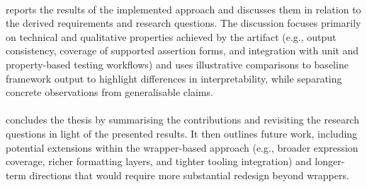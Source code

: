 \paragraph{}
    \label{Thesis Structure: Results and Discussion}
reports the results of the implemented approach and discusses them in relation to the derived
requirements and research questions. The discussion focuses primarily on technical and qualitative
properties achieved by the artifact (e.g., output consistency, coverage of supported assertion
forms, and integration with unit and property-based testing workflows) and uses illustrative
comparisons to baseline framework output to highlight differences in interpretability, while
separating concrete observations from generalisable claims.


\paragraph{}
    \label{Thesis Structure: Conclusion}
concludes the thesis by summarising the contributions and revisiting the research questions in light
of the presented results. It then outlines future work, including potential extensions within the
wrapper-based approach (e.g., broader expression coverage, richer formatting layers, and tighter
tooling integration) and longer-term directions that would require more substantial redesign beyond
wrappers.




